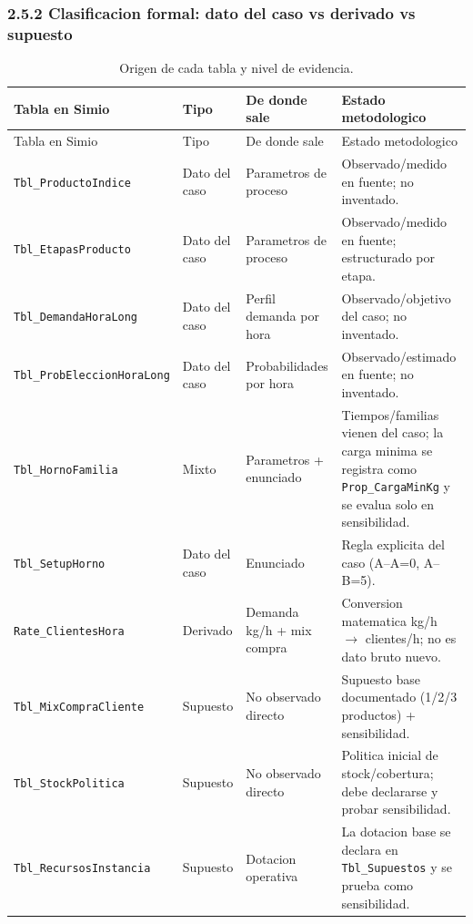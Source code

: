 \documentclass[11pt]{article}
\newcommand{\tabla}[1]{\texttt{#1}}
\newcommand{\state}[1]{\texttt{#1}}
\begin{document}
\subsubsection{2.5.2 Clasificacion formal: dato del caso vs derivado vs supuesto}

{\footnotesize
\begin{longtable}{L{3.5cm}L{2.2cm}L{4.2cm}L{4.5cm}}
\caption{Origen de cada tabla y nivel de evidencia.}\\
\toprule
{}
\color{white}Tabla en Simio & \color{white}Tipo & \color{white}De donde sale & \color{white}Estado metodologico \\
\midrule
\endfirsthead
\toprule
{}
\color{white}Tabla en Simio & \color{white}Tipo & \color{white}De donde sale & \color{white}Estado metodologico \\
\midrule
\endhead
\tabla{Tbl\_ProductoIndice} & Dato del caso & Parametros de proceso & Observado/medido en fuente; no inventado. \\
\tabla{Tbl\_EtapasProducto} & Dato del caso & Parametros de proceso & Observado/medido en fuente; estructurado por etapa. \\
\tabla{Tbl\_DemandaHoraLong} & Dato del caso & Perfil demanda por hora & Observado/objetivo del caso; no inventado. \\
\tabla{Tbl\_ProbEleccionHoraLong} & Dato del caso & Probabilidades por hora & Observado/estimado en fuente; no inventado. \\
\tabla{Tbl\_HornoFamilia} & Mixto & Parametros + enunciado & Tiempos/familias vienen del caso; la carga minima se registra como \state{Prop\_CargaMinKg} y se evalua solo en sensibilidad. \\
\tabla{Tbl\_SetupHorno} & Dato del caso & Enunciado & Regla explicita del caso (A--A=0, A--B=5). \\
\tabla{Rate\_ClientesHora} & Derivado & Demanda kg/h + mix compra & Conversion matematica kg/h $\rightarrow$ clientes/h; no es dato bruto nuevo. \\
\tabla{Tbl\_MixCompraCliente} & Supuesto & No observado directo & Supuesto base documentado (1/2/3 productos) + sensibilidad. \\
\tabla{Tbl\_StockPolitica} & Supuesto & No observado directo & Politica inicial de stock/cobertura; debe declararse y probar sensibilidad. \\
\tabla{Tbl\_RecursosInstancia} & Supuesto & Dotacion operativa & La dotacion base se declara en \tabla{Tbl\_Supuestos} y se prueba como sensibilidad. \\

\end{longtable}}
\end{document}

